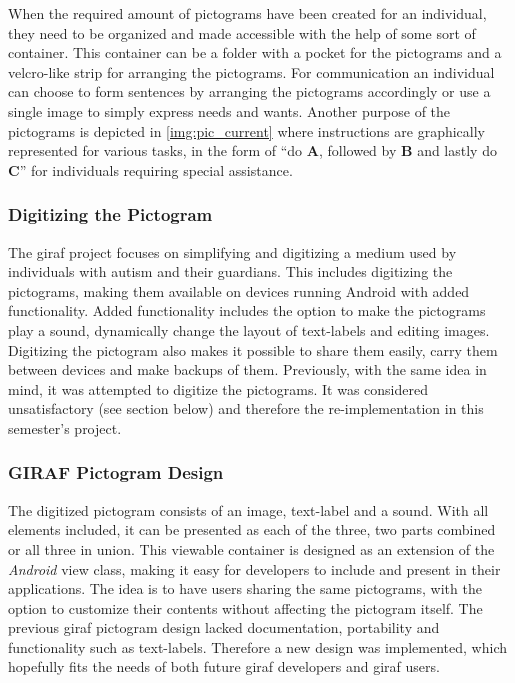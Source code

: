 When the required amount of pictograms have been created for an individual, they need to be organized and made accessible with the help of some sort of container. This container can be a folder with a pocket for the pictograms and a velcro-like strip for arranging the pictograms. For communication an individual can choose to form sentences by arranging the pictograms accordingly or use a single image to simply express needs and wants. Another purpose of the pictograms is depicted in \autoref{img:pic_current} where instructions are graphically represented for various tasks, in the form of ``do \textbf{A}, followed by \textbf{B} and lastly do \textbf{C}'' for individuals requiring special assistance.

\subsubsection*{Digitizing the Pictogram}
The \ac{giraf} project focuses on simplifying and digitizing a medium used by individuals with autism and their guardians. This includes digitizing the pictograms, making them available on devices running Android with added functionality. Added functionality includes the option to make the pictograms play a sound, dynamically change the layout of text-labels and editing images. Digitizing the pictogram also makes it possible to share them easily, carry them between devices and make backups of them. Previously, with the same idea in mind, it was attempted to digitize the pictograms. It was considered unsatisfactory (see section below) and therefore the re-implementation in this semester's project.

\subsubsection*{GIRAF Pictogram Design}
The digitized pictogram consists of an image, text-label and a sound. With all elements included, it can be presented as each of the three, two parts combined or all three in union. This viewable container is designed as an extension of the \emph{Android} view class, making it easy for developers to include and present in their applications. The idea is to have users sharing the same pictograms, with the option to customize their contents without affecting the pictogram itself. The previous \ac{giraf} pictogram design lacked documentation, portability and functionality such as text-labels. Therefore a new design was implemented, which hopefully fits the needs of both future \ac{giraf} developers and \ac{giraf} users.
